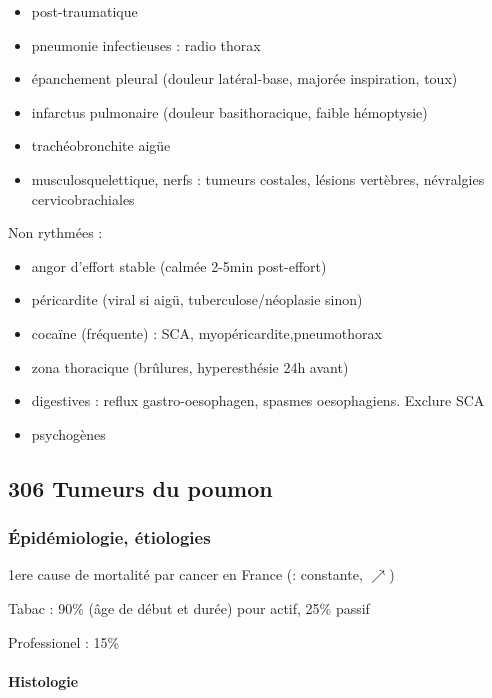 \documentclass[11pt]{article}
\begin{document}
\begin{itemize}
\item post-traumatique
\item pneumonie infectieuses : radio thorax
\item épanchement pleural (douleur latéral-base, majorée inspiration, toux)
\item infarctus pulmonaire (douleur basithoracique, faible hémoptysie)
\item trachéobronchite aigüe
\item musculosquelettique, nerfs : tumeurs costales, lésions vertèbres,
névralgies cervicobrachiales
\end{itemize}

Non rythmées :

\begin{itemize}
\item angor d'effort stable (calmée 2-5min post-effort)
\item péricardite (viral si aigü, tuberculose/néoplasie sinon)
\item cocaïne (fréquente) : SCA, myopéricardite,pneumothorax
\item zona thoracique (brûlures, hyperesthésie 24h avant)
\item digestives : reflux gastro-oesophagen, spasmes oesophagiens. Exclure SCA

\item psychogènes
\end{itemize}

\subsection{306 \textdagger{} Tumeurs du poumon}
\label{sec:orgcb5866f}
\label{sec:306_tumeurs_du_poumon}

\subsubsection{Épidémiologie, étiologies}
\label{sec:orgb4d409c}
1ere cause de mortalité par cancer en France (\male : constante, \female
\(\nearrow\))

Tabac : 90\% (âge de début et durée) pour actif, 25\% passif

Professionel : 15\%

\paragraph{Histologie}
\label{sec:org9c2a737}
\end{document}
